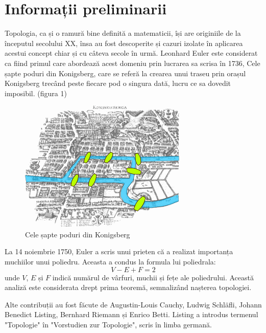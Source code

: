 \newpage
\section{Informații preliminarii}
Topologia, ca și o ramură bine definită a matematicii, își are originiile de la începutul secolului XX, 
însa au fost descoperite și cazuri izolate în aplicarea acestui concept chiar și cu câteva secole în urmă. 
Leonhard Euler este considerat ca fiind primul care abordează acest domeniu prin lucrarea sa scrisa în 1736, 
Cele șapte poduri din Konigsberg, care se referă la crearea unui traseu prin orașul Konigsberg trecând peste fiecare pod o 
singura dată, lucru ce sa dovedit imposibil. (figura 1) \newline

\begin{figure}[H]
    \begin{center}
        \includegraphics[scale=0.60]{imagini/istorie/bridge.png}        
    \end{center}    
        \caption{Cele șapte poduri din Konigsberg  \protect\footnotemark}
                    
    \label{fig:poduri}
\end{figure}


La 14 noiembrie 1750, Euler a scris unui prieten că a realizat importanța muchiilor unui poliedru. 
Aceasta a condus la formula lui poliedrala: \[V-E+F=2\] unde \(V\), \(E\) și \(F\) indică numărul de vârfuri, 
muchii și fețe ale poliedrului. Această analiză este considerata drept prima teoremă, semnalizând nașterea 
topologiei.\newline

Alte contribuții au fost făcute de Augustin-Louis Cauchy, Ludwig Schläfli, Johann Benedict Listing, 
Bernhard Riemann și Enrico Betti. Listing a introdus termenul "Topologie" în "Vorstudien zur Topologie", 
scris în limba germană.\newline 
